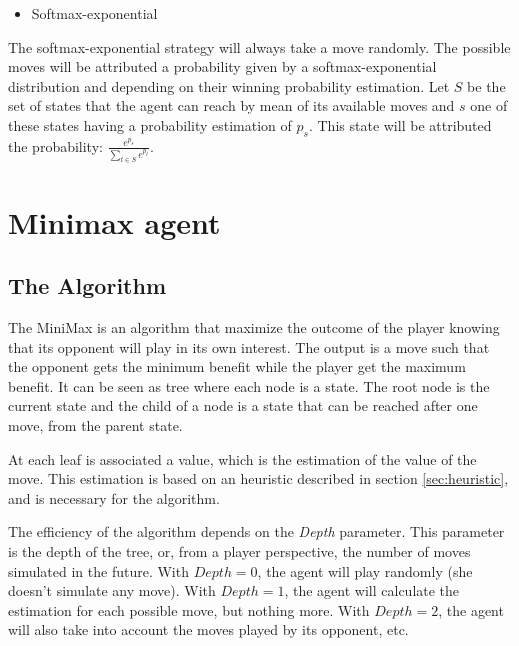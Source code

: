 \documentclass{article}
\newcommand\ddfrac[2]{\frac{\displaystyle #1}{\displaystyle #2}}
\begin{document}
\begin{itemize}
    \item Softmax-exponential
\end{itemize}

The softmax-exponential strategy will always take a move randomly. The possible moves will be attributed a probability given by a softmax-exponential distribution and depending on their winning probability estimation. Let $S$ be the set of states that the agent can reach by mean of its available moves and $s$ one of these states having a probability estimation of $p_{s}$. This state will be attributed the probability: $\ddfrac{e^{p_{s}}}{\sum_{t \in S}{e^{p_{t}}}}$.



\section{Minimax agent} \label{sec:minimax}
\subsection{The Algorithm}
The MiniMax is an algorithm that maximize the outcome of the player knowing that its opponent will play in its own interest. The output is a move such that the opponent gets the minimum benefit while the player get the maximum benefit.
It can be seen as tree where each node is a state.
The root node is the current state and the child of a node is a state that can be reached after one move, from the parent state.

At each leaf is associated a value, which is the estimation of the value of the move. This estimation is based on an heuristic described in section \ref{sec:heuristic}, and is necessary for the algorithm.

The efficiency of the algorithm depends on the \textit{Depth} parameter. This parameter is the depth of the tree, or, from a player perspective, the number of moves simulated in the future. With $Depth = 0$, the agent will play randomly (she doesn't simulate any move).
With $Depth = 1$, the agent will calculate the estimation for each possible move, but nothing more. With $Depth = 2$, the agent will also take into account the moves played by its opponent, etc.
\end{document}
